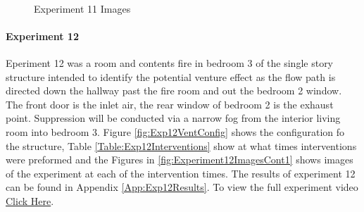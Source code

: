 \documentclass{article}
\begin{document}
\begin{figure}[H]
	\ContinuedFloat 
	\centering 
	 \ 
	 \ 
	\caption{Experiment 11 Images}
	\label{fig:Experiment11ImagesCont3} 
\end{figure}

\paragraph{Experiment 12}\mbox{}

Eperiment 12 was a room and contents fire in bedroom 3 of the single story structure intended to identify the potential venture effect as the flow path is directed down the hallway past the fire room and out the bedroom 2 window. The front door is the inlet air, the rear window of bedroom 2 is the exhaust point. Suppression will be conducted via a narrow fog from the interior living room into bedroom 3. Figure \ref{fig:Exp12VentConfig} shows the configuration fo the structure, Table \ref{Table:Exp12Interventions} show at what times interventions were preformed and the Figures in \ref{fig:Experiment12ImagesCont1} shows images of the experiment at each of the intervention times. The results of experiment 12 can be found in Appendix \ref{App:Exp12Results}. To view the full experiment video \href{https://youtu.be/4ROh9dXBXM0}{Click Here}.
\end{document}
